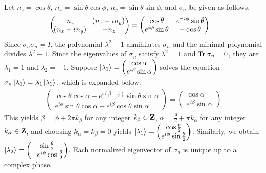 \begin{answer}
	Let $n_z = \cos \theta$, $n_x = \sin \theta \cos \phi$, $n_y = \sin \theta \sin \phi$, and $\sigma_n$ be given as follows.
	\begin{align*}
		\begin{pmatrix}
			n_z             & \!\left(n_x - i n_y\right) \\
			\!\left(n_x + i n_y\right) & - n_z
		\end{pmatrix}
		 & =
		\begin{pmatrix}
			\cos \theta             & e^{-i \phi} \sin \theta \\
			e^{i \phi } \sin \theta & - \cos \theta
		\end{pmatrix}
	\end{align*}
	Since $\sigma_n \sigma_n = I$, the polynomial $\lambda^2 - 1$ annihilates $\sigma_n$ and the minimal polynomial divides $\lambda^2 - 1$.
	Since the eigenvalues of $\sigma_n$ satisfy $\lambda^2 = 1$ and $\operatorname{Tr} \sigma_n = 0$, they are $\lambda_1 = 1$ and $\lambda_2 = -1$.
	Suppose $\ket{\lambda_1} = \begin{pmatrix} \cos \alpha \\ e^{i \beta} \sin \alpha \end{pmatrix}$ solves the equation $\sigma_n \ket{\lambda_1} = \lambda_1 \ket{\lambda_1}$, which is expanded below.
	\begin{align*}
		\begin{pmatrix}
			\cos \theta \cos \alpha + e^{i(\beta - \phi)} \sin \theta \sin \alpha \\
			e^{i \phi} \sin \theta \cos \alpha - e^{i \beta} \cos \theta \sin \alpha
		\end{pmatrix}
		=
		\begin{pmatrix}
			\cos \alpha \\
			e^{i \beta} \sin \alpha
		\end{pmatrix}
	\end{align*}
	This yields $\beta = \phi + 2 \pi k_\beta$ for any integer $k_\beta \in \mathbf{Z}$, $\alpha = \frac{\theta}{2} + \pi k_\alpha$ for any integer $k_\alpha \in \mathbf{Z}$, and choosing $k_\alpha = k_\beta = 0$ yields $\ket{\lambda_1} = \begin{pmatrix} \cos \frac{\theta}{2} \\ e^{i \phi} \sin \frac{\theta}{2} \end{pmatrix}$.
	Similarly, we obtain $\ket{\lambda_2} = \begin{pmatrix} \sin \frac{\theta}{2} \\ - e^{i \phi} \cos \frac{\theta}{2} \end{pmatrix}$.
	Each normalized eigenvector of $\sigma_n$ is unique up to a complex phase.
\end{answer}

